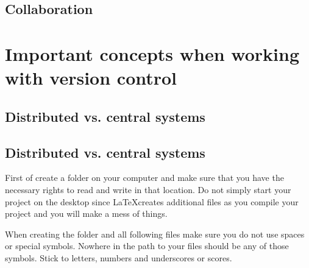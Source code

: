 \documentclass{tufte-book}
\begin{document}
\section{Collaboration}


\chapter{Important concepts when working with version control}

\section{Distributed vs. central systems}

\section{Distributed vs. central systems}



First of create a folder on your computer and make sure that you have the necessary rights to read and write in that location. Do not simply start your project on the desktop since \LaTeX creates additional files as you compile your project and you will make a mess of things.
 
When creating the folder and all following files make sure you do not use spaces or special symbols. Nowhere in the path to your files should be any of those symbols. Stick to letters, numbers and underscores or scores. 
\end{document}
